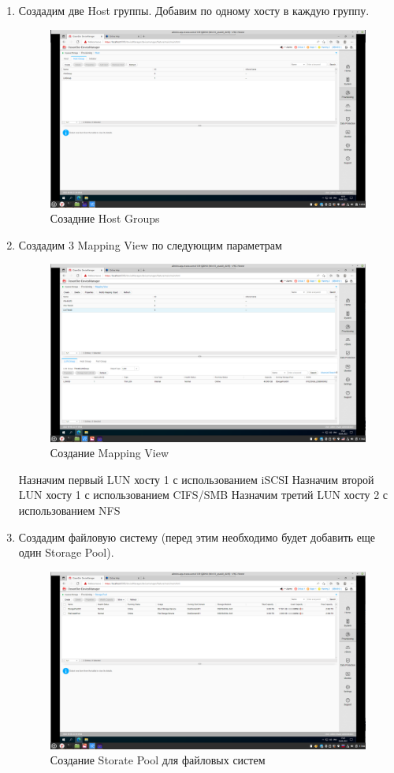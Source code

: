 \documentclass[a4paper,14pt]{extarticle}
\begin{document}
\begin{enumerate}
\newpage
\item Создадим две Host группы. Добавим по одному хосту в каждую группу.
\begin{figure}[h!]
	\centering
	\includegraphics[width=0.7\linewidth]{"images/7/Снимок экрана от 2022-04-06 16-58-31"}
	\caption{Созадние Host Groups}
	\label{fig:---2022-04-06-16-58-31}
\end{figure}

\item Создадим 3 Mapping View по следующим параметрам
\begin{figure}[h!]
	\centering
	\includegraphics[width=0.7\linewidth]{"images/7/Снимок экрана от 2022-04-06 17-43-41"}
	\caption{Создание Mapping View}
	\label{fig:---2022-04-06-17-43-41}
\end{figure}

Назначим первый LUN хосту 1 с использованием iSCSI
Назначим второй LUN хосту 1 с использованием CIFS/SMB
Назначим третий LUN хосту 2 с использованием NFS
\newpage
\item Создадим файловую систему (перед этим необходимо будет добавить
еще один Storage Pool).

\begin{figure}[h!]
	\centering
	\includegraphics[width=0.7\linewidth]{"images/7/Снимок экрана от 2022-04-06 17-46-48"}
	\caption{Создание Storate Pool для файловых систем}
	\label{fig:---2022-04-06-17-46-48}
\end{figure}



\end{enumerate}
\end{document}
